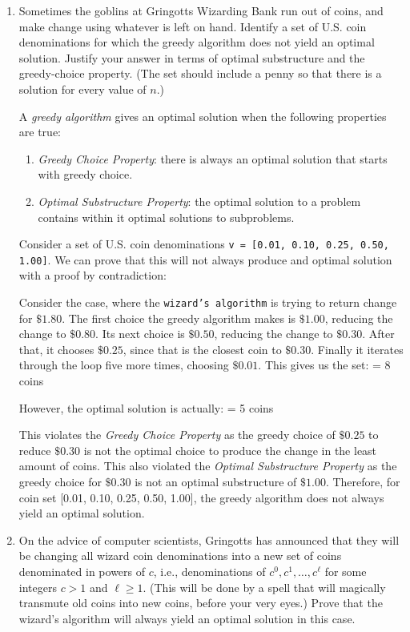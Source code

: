 \documentclass[12pt]{article}
\begin{document}
\begin{enumerate}
\begin{enumerate}
	\item Sometimes the goblins at Gringotts Wizarding Bank run out of coins, and make change using whatever is left on hand. Identify a set of U.S. coin denominations for which the greedy algorithm does not yield an optimal solution. Justify your answer in terms of optimal substructure and the greedy-choice property. (The set should include a penny so that there is a solution for every value of $n$.)

	{\color{blue}
		A \emph{greedy algorithm} gives an optimal solution when the following properties are true:
		\begin{enumerate}
			\item \emph{Greedy Choice Property}: there is always an optimal solution that starts with greedy choice.
			\item \emph{Optimal Substructure Property}: the optimal solution to a problem contains within it optimal solutions to subproblems.
		\end{enumerate}
		Consider a set of U.S. coin denominations \texttt{v = [0.01, 0.10, 0.25, 0.50, 1.00]}. We can prove that this will not always produce and optimal solution with a proof by contradiction:

		Consider the case, where the \texttt{wizard's algorithm} is trying to return change for $\$1.80$. The first choice the greedy algorithm makes is $\$1.00$, reducing the change to $\$0.80$. Its next choice is $\$0.50$, reducing the change to $\$0.30$. After that, it chooses $\$0.25$, since that is the closest coin to $\$0.30$. Finally it iterates through the loop five more times, choosing $\$0.01$. This gives us the set:
		{\center [1.00, 0.50, 0.25, 0.01, 0.01, 0.01, 0.01, 0.01] = 8 coins\endcenter}

		However, the optimal solution is actually:
		{\center [1.00, 0.50, 0.10, 0.10, 0.10] = 5 coins\endcenter}

		This violates the \emph{Greedy Choice Property} as the greedy choice of $\$0.25$ to reduce $\$0.30$ is not the optimal choice to produce the change in the least amount of coins. This also violated the \emph{Optimal Substructure Property} as the greedy choice for $\$0.30$ is not an optimal substructure of $\$1.00$. Therefore, for coin set [0.01, 0.10, 0.25, 0.50, 1.00], the greedy algorithm does not always yield an optimal solution.
	}

	\item On the advice of computer scientists, Gringotts has announced that they will be changing all wizard coin denominations into a new set of coins denominated in powers of $c$, i.e., denominations of $c^{0}, c^{1}, \dots , c^{\ell}$ for some integers $c>1$ and $\ell\geq 1$. (This will be done by a spell that will magically transmute old coins into new coins, before your very eyes.) Prove that the wizard's algorithm will always yield an optimal solution in this case. 


\end{enumerate}
\end{enumerate}
\end{document}
